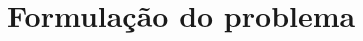 \documentclass[a4paper,12pt]{article}
\begin{document}
%


%


%

\section{Formulação do problema}



\newpage
\end{document}
